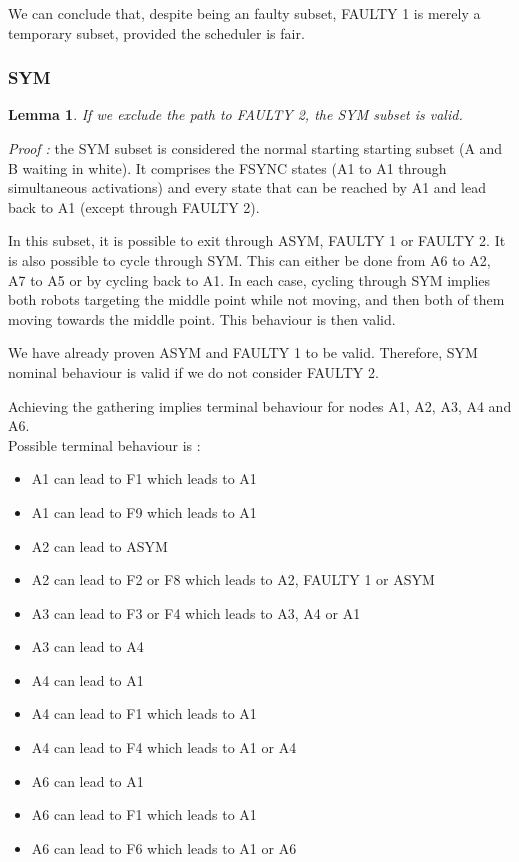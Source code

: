 \documentclass[11pt]{article}
\newtheorem{Lemma}{Lemma}
\begin{document}
We can conclude that, despite being an faulty subset, FAULTY 1 is merely a temporary subset, provided the scheduler is fair.

\subsubsection{SYM}

\begin{Lemma}
If we exclude the path to FAULTY 2, the SYM subset is valid.
\end{Lemma}

\textit{Proof :}  the SYM subset is considered the normal starting starting subset (A and B waiting in white). It comprises the FSYNC states (A1 to A1 through simultaneous activations) and every state that can be reached by A1 and lead back to A1 (except through FAULTY 2).  

In this subset, it is possible to exit through ASYM, FAULTY 1 or FAULTY 2. It is also possible to cycle through SYM. This can either be done from A6 to A2, A7 to A5 or by cycling back to A1. In each case, cycling through SYM implies both robots targeting the middle point while not moving, and then both of them moving towards the middle point. This behaviour is then valid.

We have already proven ASYM and FAULTY 1 to be valid. Therefore, SYM nominal behaviour is valid if we do not consider FAULTY 2.

Achieving the gathering implies terminal behaviour for nodes A1, A2, A3, A4 and A6.
\\

Possible terminal behaviour is :

\begin{itemize}
\item A1 can lead to F1 which leads to A1 
\item A1 can lead to F9 which leads to A1 

\item A2 can lead to ASYM
\item A2 can lead to F2 or F8 which leads to A2, FAULTY 1 or ASYM

\item A3 can lead to F3 or F4 which leads to A3, A4 or A1
\item A3 can lead to A4 

\item A4 can lead to A1
\item A4 can lead to F1 which leads to A1 
\item A4 can lead to F4 which leads to A1 or A4

\item A6 can lead to A1 
\item A6 can lead to F1 which leads to A1 
\item A6 can lead to F6 which leads to A1 or A6
\end{itemize}
\end{document}
